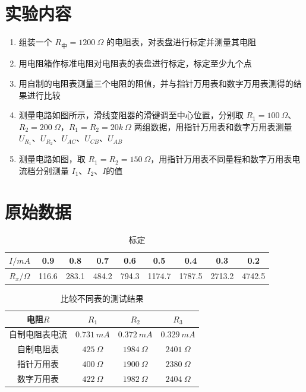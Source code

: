 \documentclass[UTF8]{ctexart}
\title{}
\author{}
\date{}
\begin{document}
\begin{titlepage}		
		
\end{titlepage}



\section{实验内容}
\begin{enumerate}
    \item 组装一个 $R_{\text{中}} = 1200 \  \Omega$ 的电阻表，对表盘进行标定并测量其电阻
    \item 用电阻箱作标准电阻对电阻表的表盘进行标定，标定至少九个点
    \item 用自制的电阻表测量三个电阻的阻值，并与指针万用表和数字万用表测得的结果进行比较
    \item 测量电路如图所示，滑线变阻器的滑键调至中心位置，分别取 $R_1 = 100 \  \Omega$、$R_2 = 200 \ \Omega$，$R_1 = R_2 = 20 k \ \Omega$ 两组数据，用指针万用表和数字万用表测量 $U_{R_1}$、$U_{R_2}$、$U_{AC}$、$U_{CB}$、$U_{AB}$
    \item 测量电路如图，取 $R_1 = R_2 = 150 \ \Omega$，用指针万用表不同量程和数字万用表电流档分别测量 $I_1$、$I_2$、$I$的值
    
\end{enumerate}
\vspace{5cm}

\section{原始数据}

\begin{table}[H]
    \centering
    \caption{标定}
    \begin{tabular}{|c|c|c|c|c|c|c|c|c|}
    \hline
       $I/mA$  & 0.9 & 0.8 & 0.7 & 0.6 & 0.5 & 0.4 & 0.3 & 0.2  \\
    \hline
        $R_x/\Omega$   &  116.6 & 283.1  & 484.2  & 794.3  & 1174.7  & 1787.5  & 2713.2 & 4742.5 \\
    \hline
    \end{tabular}
\end{table}

\begin{table}[H]
    \centering
    \caption{比较不同表的测试结果}
    \begin{tabular}{|c|c|c|c|}
    \hline
      电阻$R$ &  $R_1$   &  $R_2$  &  $R_3$  \\
     \hline
     自制电阻表电流  &  $0.731\ mA$  & $0.372\ mA$  & $0.329\ mA$ \\
     \hline
     自制电阻表   & $425 \ \Omega$  & $1984 \ \Omega$ &  $2401 \ \Omega$ \\
     \hline
     指针万用表  &  $400 \ \Omega$  &  $1900\ \Omega$  & $2380\ \Omega$  \\
     \hline
     数字万用表  &  $422\ \Omega$  & $1982\ \Omega$  &  $2404\ \Omega$  \\
     \hline
    \end{tabular}
\end{table}
\end{document}
